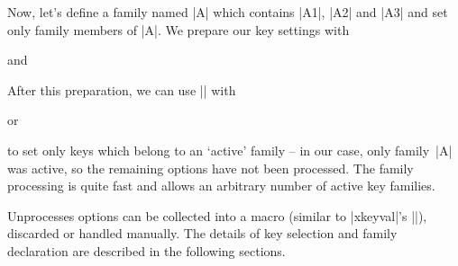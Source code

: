 Now, let's define a family named |A| which contains |A1|, |A2| and |A3| and set only family members of |A|. We prepare our key settings with
\begin{codeexample}
\end{codeexample}
\noindent and
\begin{codeexample}
\end{codeexample}
\noindent After this preparation, we can use |\pgfkeysfiltered| with
\begin{codeexample}[]
\end{codeexample}
\noindent or
\begin{codeexample}[]
\end{codeexample}
\noindent to set only keys which belong to an `active' family -- in our case, only family~|A| was active, so the remaining options have not been processed. The family processing is quite fast and allows an arbitrary number of active key families.

Unprocesses options can be collected into a macro (similar to |xkeyval|'s |\xkv@rm|), discarded or handled manually. The details of key selection and family declaration are described in the following sections.

